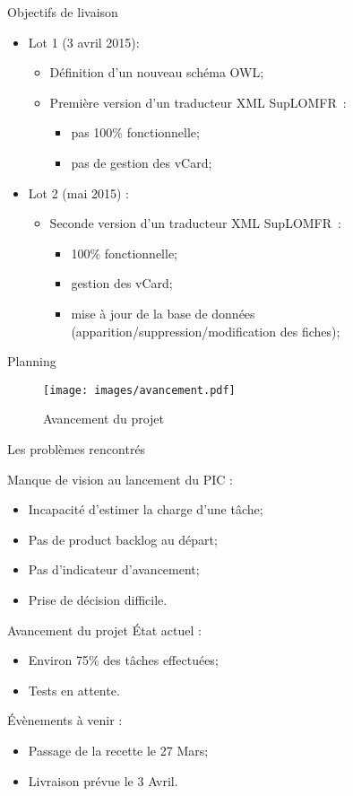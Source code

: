 \begin{frame}{Objectifs de livaison}

\begin{itemize}
  \item Lot 1 (3 avril 2015):
  \begin{itemize}
    \item Définition d'un nouveau schéma OWL;
    \item Première version d'un traducteur XML SupLOMFR~:
    \begin{itemize}
      \item pas 100\% fonctionnelle;
      \item pas de gestion des vCard;
    \end{itemize}
  \end{itemize}
  \pause
  \item Lot 2 (mai 2015) :
  \begin{itemize}
    \item Seconde version d'un traducteur XML SupLOMFR~:
    \begin{itemize}
      \item 100\% fonctionnelle;
      \item gestion des vCard;
      \item mise à jour de la base de données (apparition/suppression/modification des fiches);
    \end{itemize}
  \end{itemize}
\end{itemize}

\end{frame}

\begin{frame}{Planning}
\begin{figure}
    \centering
    \texttt{[image: images/avancement.pdf]}
    \caption{Avancement du projet}
  \end{figure}
\end{frame}

\begin{frame}{Les problèmes rencontrés}

Manque de vision au lancement du PIC :
 \begin{itemize}
\item Incapacité d'estimer la charge d'une tâche;
\item Pas de product backlog au départ;
\item Pas d'indicateur d'avancement;
\item Prise de décision difficile.
\end{itemize}
\end{frame}

\begin{frame}{Avancement du projet}
État actuel :
\begin{itemize}
\item Environ 75\% des tâches effectuées;
\item Tests en attente.
\end{itemize}
Évènements à venir :
\begin{itemize}
\item Passage de la recette le 27 Mars;
\item Livraison prévue le 3 Avril.
\end{itemize}

\end{frame}
